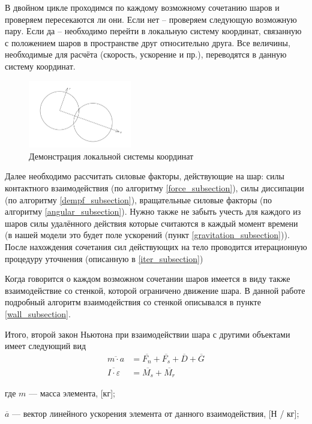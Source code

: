 \documentclass[a4paper]{article}
\begin{document}
В двойном цикле проходимся по каждому возможному сочетанию шаров и проверяем пересекаются ли они.
Если нет -- проверяем следующую возможную пару.
Если да -- необходимо перейти в локальную систему координат, связанную с положением шаров в пространстве друг относительно друга. Все величины, необходимые для расчёта (скорость, ускорение и пр.), переводятся в данную систему координат.

\begin{figure}[h!]
	\centering
	\includegraphics[width=0.4\textwidth]{local}
	\caption{Демонстрация локальной системы координат}
	\label{pic:local}
\end{figure} 

Далее необходимо рассчитать силовые факторы, действующие на шар: силы контактного взаимодействия (по алгоритму \ref{force_subsection}), силы диссипации (по алгоритму \ref{dempf_subsection}), вращательные силовые факторы (по алгоритму \ref{angular_subsection}). 
Нужно также не забыть учесть для каждого из шаров силы удалённого действия которые считаются в каждый момент времени (в нашей модели это будет поле ускорений (пункт \ref{gravitation_subsection})). 
После нахождения сочетания сил действующих на тело проводится итерационную процедуру уточнения (описанную в \ref{iter_subsection})

Когда говорится о каждом возможном сочетании шаров имеется в виду также взаимодействие со стенкой, которой ограничено движение шара. 
В данной работе подробный алгоритм взаимодействия со стенкой описывался в пункте \ref{wall_subsection}.

Итого, второй закон Ньютона при взаимодействии шара с другими объектами имеет следующий вид
\begin{align}
\overline{m \cdot a} &= \overline{F_n} + \overline{F_s} + \overline{D} + \overline{G}\\
\overline{I \cdot \varepsilon} &= \overline{M_s} + \overline{M_r}
\end{align}

где $m$ --- масса элемента, [кг];

$\overline{a}$ --- вектор линейного ускорения элемента от данного взаимодействия, [Н / кг];
\end{document}
